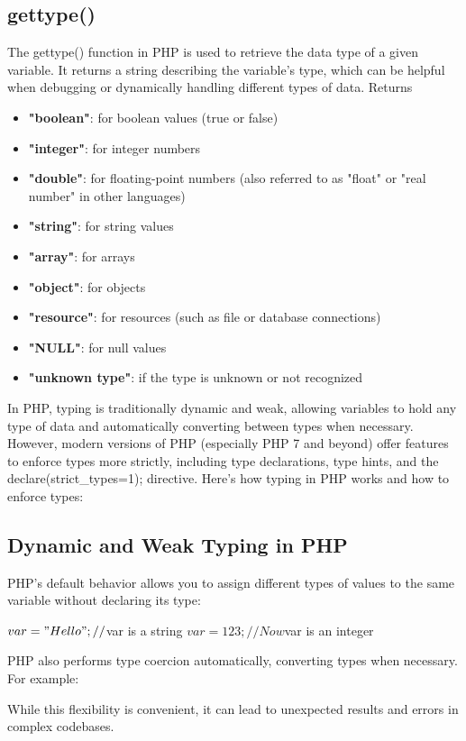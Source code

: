 \documentclass{report}
\begin{document}
\subsection{gettype()}
\bigbreak \noindent 
The gettype() function in PHP is used to retrieve the data type of a given variable. It returns a string describing the variable's type, which can be helpful when debugging or dynamically handling different types of data.
\bigbreak \noindent 
Returns
\begin{itemize}
    \item \textbf{"boolean"}: for boolean values (true or false)
    \item \textbf{"integer"}: for integer numbers
    \item \textbf{"double"}: for floating-point numbers (also referred to as "float" or "real number" in other languages)
    \item \textbf{"string"}: for string values
    \item \textbf{"array"}: for arrays
    \item \textbf{"object"}: for objects
    \item \textbf{"resource"}: for resources (such as file or database connections)
    \item \textbf{"NULL"}: for null values
    \item \textbf{"unknown type"}: if the type is unknown or not recognized
\end{itemize}





\pagebreak 
{}
\bigbreak \noindent 
In PHP, typing is traditionally dynamic and weak, allowing variables to hold any type of data and automatically converting between types when necessary. However, modern versions of PHP (especially PHP 7 and beyond) offer features to enforce types more strictly, including type declarations, type hints, and the declare(strict\_types=1); directive. Here’s how typing in PHP works and how to enforce types:

\bigbreak \noindent 
\subsection{Dynamic and Weak Typing in PHP}
\bigbreak \noindent 
PHP’s default behavior allows you to assign different types of values to the same variable without declaring its type:
\bigbreak \noindent 
\begin{phpcode}
$var = "Hello";   // $var is a string
$var = 123;       // Now $var is an integer
\end{phpcode}
\bigbreak \noindent 
PHP also performs type coercion automatically, converting types when necessary. For example:
\bigbreak \noindent 
{}
\bigbreak \noindent 
While this flexibility is convenient, it can lead to unexpected results and errors in complex codebases.
\end{document}
